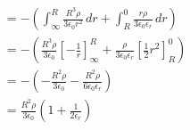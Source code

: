 \documentclass{article}
\begin{document}
\begin{align*}
                                & = -\left( \int_\infty^R \frac{R^3 \rho}{3 \epsilon_0 r^2} \,d r + \int_R^0 \frac{r \rho}{3 \epsilon_0 \epsilon_r} \,d r \right)                                \\
                                & = -\left( \frac{R^3 \rho}{3 \epsilon_0} \left[ -\frac{1}{r} \right]_\infty^R + \frac{\rho}{3 \epsilon_0 \epsilon_r} \left[ \frac{1}{2} r^2 \right]_R^0 \right) \\
                                & = -\left( -\frac{R^2 \rho}{3 \epsilon_0} - \frac{R^2 \rho}{6 \epsilon_0 \epsilon_r} \right)                                                                    \\
                                & = \frac{R^2 \rho}{3 \epsilon_0} \left( 1 + \frac{1}{2 \epsilon_r} \right)
\end{align*}

\subsection{}
\end{document}
